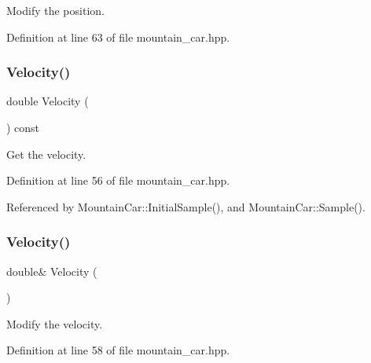 Modify the position. 



Definition at line 63 of file mountain\+\_\+car.\+hpp.

\mbox{\label{classmlpack_1_1rl_1_1MountainCar_1_1State_a5281cef88d4e272d6cb8581bff91195a}} 
\subsubsection{Velocity()\hspace{0.1cm}{\footnotesize\ttfamily [1/2]}}
{\footnotesize\ttfamily double Velocity (\begin{DoxyParamCaption}{ }\end{DoxyParamCaption}) const\hspace{0.3cm}{\ttfamily [inline]}}



Get the velocity. 



Definition at line 56 of file mountain\+\_\+car.\+hpp.



Referenced by Mountain\+Car\+::\+Initial\+Sample(), and Mountain\+Car\+::\+Sample().

\mbox{\label{classmlpack_1_1rl_1_1MountainCar_1_1State_a2bdce16cfc8c84b65f13ee9fffab1266}} 
\subsubsection{Velocity()\hspace{0.1cm}{\footnotesize\ttfamily [2/2]}}
{\footnotesize\ttfamily double\& Velocity (\begin{DoxyParamCaption}{ }\end{DoxyParamCaption})\hspace{0.3cm}{\ttfamily [inline]}}



Modify the velocity. 



Definition at line 58 of file mountain\+\_\+car.\+hpp.



